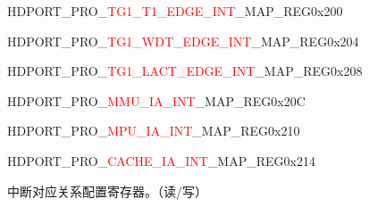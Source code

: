 \vspace{-3em}
\begin{register}{H}{DPORT\_PRO\_\textcolor{red}{TG1\_T1\_EDGE\_INT}\_MAP\_REG}{0x200}\label{regdesc:PROTG1T1EDGEINTMAPREG}
\end{register}
\vspace{-3em}
\begin{register}{H}{DPORT\_PRO\_\textcolor{red}{TG1\_WDT\_EDGE\_INT}\_MAP\_REG}{0x204}\label{regdesc:PROTG1WDTEDGEINTMAPREG}
\end{register}
\vspace{-3em}
\begin{register}{H}{DPORT\_PRO\_\textcolor{red}{TG1\_LACT\_EDGE\_INT}\_MAP\_REG}{0x208}\label{regdesc:PROTG1LACTEDGEINTMAPREG}
\end{register}
\vspace{-3em}
\begin{register}{H}{DPORT\_PRO\_\textcolor{red}{MMU\_IA\_INT}\_MAP\_REG}{0x20C}\label{regdesc:PROMMUIAINTMAPREG}
\end{register}
\vspace{-3em}
\begin{register}{H}{DPORT\_PRO\_\textcolor{red}{MPU\_IA\_INT}\_MAP\_REG}{0x210}\label{regdesc:PROMPUIAINTMAPREG}
\end{register}
\vspace{-3em}
\begin{register}{H}{DPORT\_PRO\_\textcolor{red}{CACHE\_IA\_INT}\_MAP\_REG}{0x214}\label{regdesc:PROCACHEIAINTMAPREG}
%
%
\regnewline%
\begin{regdesc}\begin{reglist}
\item [DPORT\_PRO\_\textcolor{red}{*}\_MAP]中断对应关系配置寄存器。（读/写）
\end{reglist}\end{regdesc}
\end{register}


